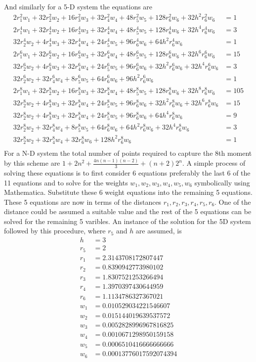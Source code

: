 \documentclass{article}
\begin{document}
And similarly for a 5-D system the equations are
\begin{align*}
2r_1^2w_1+32r_2^2w_2+16r_3^2w_3+32r_4^2w_4+48r_5^2w_5+128r_6^2w_6+32h^2r_6^2w_6&=1\\
2r_1^4w_1+32r_2^4w_2+16r_3^4w_3+32r_4^4w_4+48r_5^4w_5+128r_6^4w_6+32h^4r_6^4w_6&=3\\
32r_2^4w_2+4r_3^4w_3+32r_4^4w_4+24r_5^4w_5+96r_6^4w_6+64h^2r_6^4w_6&=1\\
2r_1^6w_1+32r_2^6w_2+16r_3^6w_3+32r_4^6w_4+48r_5^6w_5+128r_6^6w_6+32h^6r_6^6w_6&=15\\
32r_2^6w_2+4r_3^6w_3+32r_4^6w_4+24r_5^6w_5+96r_6^6w_6+32h^2r_6^6w_6+32h^4r_6^6w_6&=3\\
32r_2^6w_2+32r_4^6w_4+8r_5^6w_5+64r_6^6w_6+96h^2r_6^6w_6&=1\\
2r_1^8w_1+32r_2^8w_2+16r_3^8w_3+32r_4^8w_4+48r_5^8w_5+128r_6^8w_6+32h^8r_6^8w_6&=105\\
32r_2^8w_2+4r_3^8w_3+32r_4^8w_4+24r_5^8w_5+96r_6^8w_6+32h^2r_6^8w_6+32h^6r_6^8w_6&=15\\
32r_2^8w_2+4r_3^8w_3+32r_4^8w_4+24r_5^8w_5+96r_6^8w_6+64h^4r_6^8w_6&=9\\
32r_2^8w_2+32r_4^8w_4+8r_5^8w_5+64r_6^8w_6+64h^2r_6^8w_6+32h^4r_6^8w_6&=3\\
32r_2^8w_2+32r_4^8w_4+32r_6^8w_6+128h^2r_6^8w_6&=1\\
\end{align*}
For a N-D system the total number of points required to capture the 8th moment  by this scheme are $1+2n^2+\frac{4n(n-1)(n-2)}{3}+(n+2)2^n$. A simple process of solving these equations is to first consider 6 equations preferably the last 6 of the 11 equations and to solve for the weights $w_1,w_2,w_3,w_4,w_5,w_6$ symbolically using Mathematica. Substitute these 6 weight equations into the remaining 5 equations. These 5 equations are now in terms of the distances $r_1,r_2,r_3,r_4,r_5,r_6$. One of the distance could be assumed a suitable value and the rest of the 5 equations can be solved for the remaining 5 varibles. An instance of the solution for the 5D system followed by this procedure, where $r_5$ and $h$ are assumed, is 
\begin{align}
h&=3 \nonumber \\
r_5&=2\nonumber\\
r_1&=2.3143708172807447\nonumber\\
r_2&=0.8390942773980102\nonumber\\
r_3&=1.8307521253266494\nonumber\\
r_4&=1.3970397430644959\nonumber\\
r_6&=1.1134786327367021\nonumber\\
w_1 &= 0.010529034221546607\nonumber\\
w_2 &= 0.015144019639537572\nonumber\\
w_3 &= 0.0052828996967816825\nonumber\\
w_4&=0.0010671298950159158\nonumber\\
w_5&=0.0006510416666666666\nonumber\\
w_6 &= 0.00013776017592074394 \label{eq:sol1}
\end{align}
\end{document}
